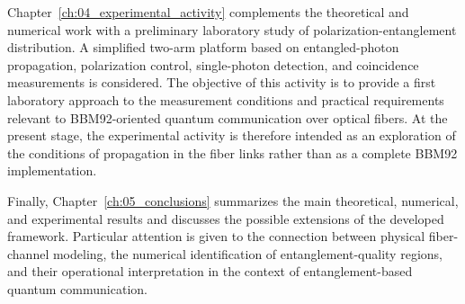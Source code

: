 Chapter~\ref{ch:04_experimental_activity} complements the theoretical and numerical
work with a preliminary laboratory study of polarization-entanglement
distribution. A simplified two-arm platform based on entangled-photon propagation,
polarization control, single-photon detection, and coincidence measurements is
considered. The objective of this activity is to provide a first laboratory
approach to the measurement conditions and practical requirements relevant to
BBM92-oriented quantum communication over optical fibers. At the present stage,
the experimental activity is therefore intended as an exploration of the
conditions of propagation in the fiber links rather than as a complete BBM92 implementation.

Finally, Chapter~\ref{ch:05_conclusions} summarizes the main theoretical,
numerical, and experimental results and discusses the possible extensions of the
developed framework. Particular attention is given to the connection between
physical fiber-channel modeling, the numerical identification of
entanglement-quality regions, and their operational interpretation in the context
of entanglement-based quantum communication.